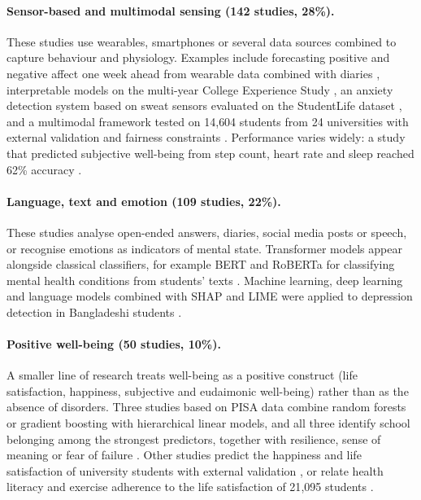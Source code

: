 \documentclass[11pt,a4paper]{article}
\begin{document}
\paragraph{Sensor-based and multimodal sensing (142 studies, 28\%).} These studies use wearables, smartphones or several data sources combined to capture behaviour and physiology. Examples include forecasting positive and negative affect one week ahead from wearable data combined with diaries \cite{D061}, interpretable models on the multi-year College Experience Study \cite{I089,I100}, an anxiety detection system based on sweat sensors evaluated on the StudentLife dataset \cite{D023}, and a multimodal framework tested on 14{,}604 students from 24 universities with external validation and fairness constraints \cite{S005}. Performance varies widely: a study that predicted subjective well-being from step count, heart rate and sleep reached 62\% accuracy \cite{D080}.

\paragraph{Language, text and emotion (109 studies, 22\%).} These studies analyse open-ended answers, diaries, social media posts or speech, or recognise emotions as indicators of mental state. Transformer models appear alongside classical classifiers, for example BERT and RoBERTa for classifying mental health conditions from students' texts \cite{I090,I254}. Machine learning, deep learning and language models combined with SHAP and LIME were applied to depression detection in Bangladeshi students \cite{D045}.

\paragraph{Positive well-being (50 studies, 10\%).} A smaller line of research treats well-being as a positive construct (life satisfaction, happiness, subjective and eudaimonic well-being) rather than as the absence of disorders. Three studies based on PISA data combine random forests or gradient boosting with hierarchical linear models, and all three identify school belonging among the strongest predictors, together with resilience, sense of meaning or fear of failure \cite{S040,S041,S048}. Other studies predict the happiness and life satisfaction of university students with external validation \cite{S021}, or relate health literacy and exercise adherence to the life satisfaction of 21{,}095 students \cite{D007}.
\end{document}
